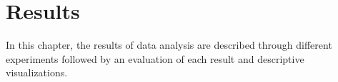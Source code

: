 \section{Results}
\label{sec:results}

In this chapter, the results of data analysis are described through different experiments followed by an evaluation of each result and descriptive visualizations.





